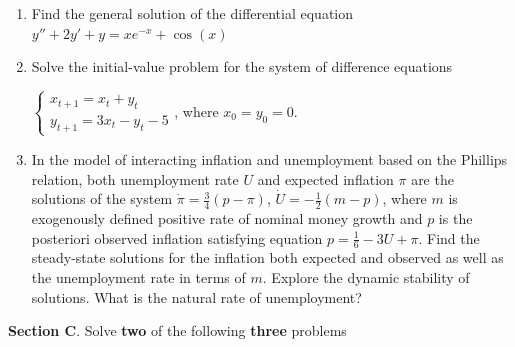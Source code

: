 \documentclass[12pt]{article} %
\theoremstyle{definition} %
\begin{document}
\begin{enumerate}[resume]
\item Find the general solution of the differential equation $y''+2y'+y=xe^{-x}+\cos(x)$
\item Solve the initial-value problem for the system of difference equations


$ \left\{ \begin{array}{l}
x_{t+1}=x_t+y_t \\
y_{t+1}=3x_t-y_t-5
\end{array} \right.$, where $x_0=y_0=0$.

\item In the model of interacting inflation and unemployment based on the Phillips relation,  both unemployment rate $U$ and expected inflation $\pi$ are the solutions of the system $\dot{\pi}=\frac{3}{4}(p-\pi)$, $\dot{U}=-\frac{1}{2}(m-p)$, where $m$ is exogenously defined positive rate of nominal money growth and $p$ is the posteriori observed inflation satisfying equation $p=\frac{1}{6}-3U+\pi$. Find the steady-state solutions for the inflation both expected and observed as well as the unemployment rate in terms of $m$. Explore the dynamic stability of solutions. What is the natural rate of unemployment?

\end{enumerate}

\vspace{12pt}

\textbf{Section C}. Solve \textbf{two} of the following \textbf{three} problems

\vspace{12pt}
\end{document}
